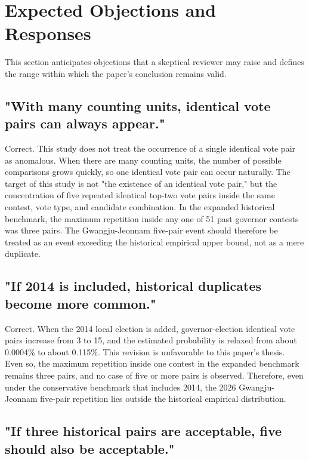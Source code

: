 \documentclass[preprint]{../ieie/IEIE}
\begin{document}
\section{Expected Objections and Responses}

This section anticipates objections that a skeptical reviewer may raise and defines the range within which the paper's conclusion remains valid.

\subsection{"With many counting units, identical vote pairs can always appear."}

Correct. This study does not treat the occurrence of a single identical vote pair as anomalous. When there are many counting units, the number of possible comparisons grows quickly, so one identical vote pair can occur naturally. The target of this study is not "the existence of an identical vote pair," but the concentration of five repeated identical top-two vote pairs inside the same contest, vote type, and candidate combination. In the expanded historical benchmark, the maximum repetition inside any one of 51 past governor contests was three pairs. The Gwangju-Jeonnam five-pair event should therefore be treated as an event exceeding the historical empirical upper bound, not as a mere duplicate.

\subsection{"If 2014 is included, historical duplicates become more common."}

Correct. When the 2014 local election is added, governor-election identical vote pairs increase from 3 to 15, and the estimated probability is relaxed from about 0.0004\% to about 0.115\%. This revision is unfavorable to this paper's thesis. Even so, the maximum repetition inside one contest in the expanded benchmark remains three pairs, and no case of five or more pairs is observed. Therefore, even under the conservative benchmark that includes 2014, the 2026 Gwangju-Jeonnam five-pair repetition lies outside the historical empirical distribution.

\subsection{"If three historical pairs are acceptable, five should also be acceptable."}
\end{document}
